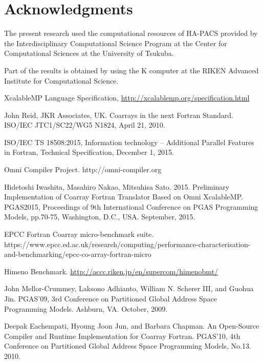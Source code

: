 \documentclass[graybox]{svmult}
\begin{document}
\section*{Acknowledgments}
                                   
The present research used the computational resources of HA-PACS provided by the 
Interdisciplinary Computational Science Program at the Center for 
Computational Sciences at the University of Tsukuba. 

Part of the results is obtained by using the K computer at the RIKEN Advanced 
Institute for Computational Science. %


\begin{thebibliography}{99}

XcalableMP Language Specification, \url{http://xcalablemp.org/specification.html}

John Reid, JKR Associates, UK. Coarrays in the next Fortran Standard.
ISO/IEC JTC1/SC22/WG5 N1824, April 21, 2010.

 ISO/IEC TS 18508:2015, Information technology -- 
Additional Parallel Features in Fortran, Technical Specification, December 1, 2015.

Omni Compiler Project. http://omni-compiler.org

Hidetoshi Iwashita, Masahiro Nakao, Mitsuhisa Sato. 2015. Preliminary Implementation 
of Coarray Fortran Translator Based on Omni XcalableMP. PGAS2015, Proceedings of 9th 
International Conference on PGAS Programming Models, pp.70-75, Washington, D.C., USA.
September, 2015.

 EPCC Fortran Coarray micro-benchmark suite.\\
https://www.epcc.ed.ac.uk/research/computing/performance-characterisation-and-benchmarking/epcc-co-array-fortran-micro

Himeno Benchmark. \url{http://accc.riken.jp/en/supercom/himenobmt/}

John Mellor-Crummey, Laksono Adhianto, William N. Scherer III, and Guohua Jin. 
PGAS’09, 3rd Conference on Partitioned Global Address Space Programming Models. 
Ashburn, VA. October, 2009.

Deepak Eachempati, Hyoung Joon Jun, and Barbara Chapman. 
An Open-Source Compiler and Runtime Implementation for Coarray Fortran. 
PGAS’10, 4th Conference on Partitioned Global Address Space Programming Models, 
No.13. 2010.


\end{thebibliography}
\end{document}
